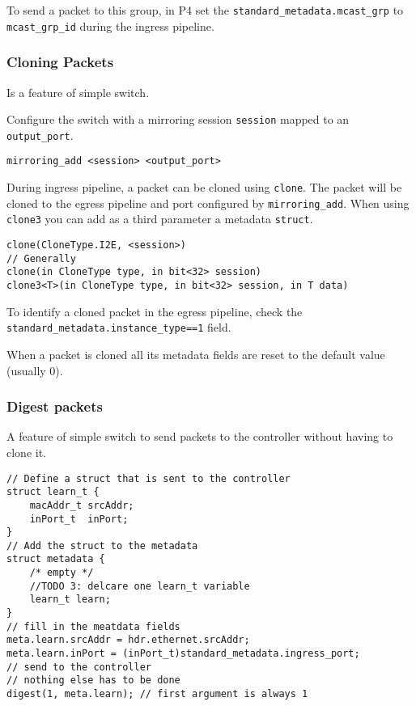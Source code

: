 \documentclass[a4paper, fontsize=8pt, landscape, DIV=1]{scrartcl}
\begin{document}
\begin{multicols*}{3}
  To send a packet to this group, in P4 set the \texttt{standard\_metadata.mcast\_grp} to \texttt{mcast\_grp\_id} during the ingress pipeline.

  \subsubsection{Cloning Packets}
  Is a feature of simple switch.

  Configure the switch with a mirroring session \texttt{session} mapped to an \texttt{output\_port}.
  \begin{lstlisting}[style=P4style]
mirroring_add <session> <output_port>\end{lstlisting}

  During ingress pipeline, a packet can be cloned using \texttt{clone}. The packet will be cloned to the egress pipeline and port configured by \texttt{mirroring\_add}. When using \texttt{clone3} you can add as a third parameter a metadata \texttt{struct}.
  \begin{lstlisting}[style=P4style]
clone(CloneType.I2E, <session>)
// Generally
clone(in CloneType type, in bit<32> session)
clone3<T>(in CloneType type, in bit<32> session, in T data)\end{lstlisting}

  To identify a cloned packet in the egress pipeline, check the \texttt{standard\_metadata.instance\_type==1} field.

  When a packet is cloned all its metadata fields
  are reset to the default value (usually 0).


  \subsubsection{Digest packets}
  A feature of simple switch to send packets to the controller without having to clone it.

  \begin{lstlisting}[style=P4style]
// Define a struct that is sent to the controller
struct learn_t {
    macAddr_t srcAddr;
    inPort_t  inPort;
}
// Add the struct to the metadata
struct metadata {
    /* empty */
    //TODO 3: delcare one learn_t variable
    learn_t learn;
}
// fill in the meatdata fields
meta.learn.srcAddr = hdr.ethernet.srcAddr;
meta.learn.inPort = (inPort_t)standard_metadata.ingress_port;
// send to the controller
// nothing else has to be done
digest(1, meta.learn); // first argument is always 1\end{lstlisting}

  
\end{multicols*}

\setcounter{secnumdepth}{2}
\end{document}
